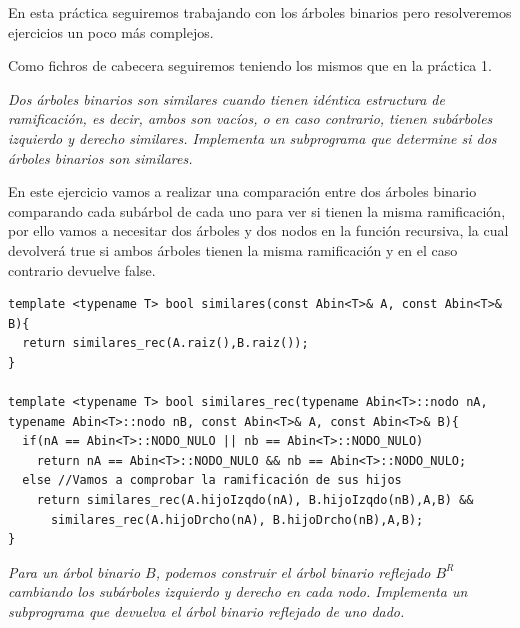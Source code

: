 En esta práctica seguiremos trabajando con los árboles binarios pero resolveremos ejercicios un poco más complejos.

Como fichros de cabecera seguiremos teniendo los mismos que en la práctica 1.

\textbf{\large{}}\textit{ Dos árboles binarios son similares cuando tienen idéntica estructura de ramificación,
es decir, ambos son vacíos, o en caso contrario, tienen subárboles izquierdo y derecho
similares. Implementa un subprograma que determine si dos árboles binarios son
similares.}

En este ejercicio vamos a realizar una comparación entre dos árboles binario comparando cada subárbol de cada uno para ver si tienen la misma ramificación, por ello vamos a necesitar dos árboles y dos nodos en la función recursiva, la cual devolverá true si ambos árboles tienen la misma ramificación y en el caso contrario devuelve false.

\begin{verbatim}
template <typename T> bool similares(const Abin<T>& A, const Abin<T>& B){
  return similares_rec(A.raiz(),B.raiz());
}

template <typename T> bool similares_rec(typename Abin<T>::nodo nA, typename Abin<T>::nodo nB, const Abin<T>& A, const Abin<T>& B){
  if(nA == Abin<T>::NODO_NULO || nb == Abin<T>::NODO_NULO)
    return nA == Abin<T>::NODO_NULO && nb == Abin<T>::NODO_NULO;
  else //Vamos a comprobar la ramificación de sus hijos
    return similares_rec(A.hijoIzqdo(nA), B.hijoIzqdo(nB),A,B) &&
      similares_rec(A.hijoDrcho(nA), B.hijoDrcho(nB),A,B);
}
\end{verbatim}

\textbf{\large{}}\textit{ Para un árbol binario \(B\), podemos construir el árbol binario reflejado \(B^R\) cambiando los subárboles izquierdo y derecho en cada nodo. Implementa un subprograma que devuelva el árbol binario reflejado de uno dado.}


